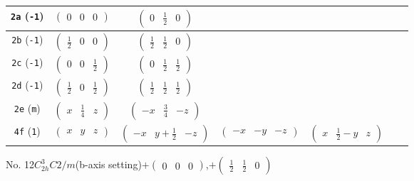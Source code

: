 \documentclass[fleqn,9pt,landscape]{jsarticle}
\begin{document}
\begin{center}
\begin{longtable}{ccccccc}
{\tt 2a} ({\tt -1}) & $ \begin{pmatrix} 0 & 0 & 0 \end{pmatrix} $ & $ \begin{pmatrix} 0 & \frac{1}{2} & 0 \end{pmatrix} $ & $  $ & $  $ \\ \hline
{\tt 2b} ({\tt -1}) & $ \begin{pmatrix} \frac{1}{2} & 0 & 0 \end{pmatrix} $ & $ \begin{pmatrix} \frac{1}{2} & \frac{1}{2} & 0 \end{pmatrix} $ & $  $ & $  $ \\ \hline
{\tt 2c} ({\tt -1}) & $ \begin{pmatrix} 0 & 0 & \frac{1}{2} \end{pmatrix} $ & $ \begin{pmatrix} 0 & \frac{1}{2} & \frac{1}{2} \end{pmatrix} $ & $  $ & $  $ \\ \hline
{\tt 2d} ({\tt -1}) & $ \begin{pmatrix} \frac{1}{2} & 0 & \frac{1}{2} \end{pmatrix} $ & $ \begin{pmatrix} \frac{1}{2} & \frac{1}{2} & \frac{1}{2} \end{pmatrix} $ & $  $ & $  $ \\ \hline
{\tt 2e} ({\tt m}) & $ \begin{pmatrix} x & \frac{1}{4} & z \end{pmatrix} $ & $ \begin{pmatrix} - x & \frac{3}{4} & - z \end{pmatrix} $ & $  $ & $  $ \\ \hline
{\tt 4f} ({\tt 1}) & $ \begin{pmatrix} x & y & z \end{pmatrix} $ & $ \begin{pmatrix} - x & y + \frac{1}{2} & - z \end{pmatrix} $ & $ \begin{pmatrix} - x & - y & - z \end{pmatrix} $ & $ \begin{pmatrix} x & \frac{1}{2} - y & z \end{pmatrix} $ \\
\end{longtable}
\end{center}
\newpage
No. 12\quad$C_{2h}^{3}$\quad$C2/m$\quad(b-axis setting)\quad[ monoclinic ]\quad$+\begin{pmatrix} 0 & 0 & 0 \end{pmatrix}$,\quad $+\begin{pmatrix} \frac{1}{2} & \frac{1}{2} & 0 \end{pmatrix}$
\end{document}
